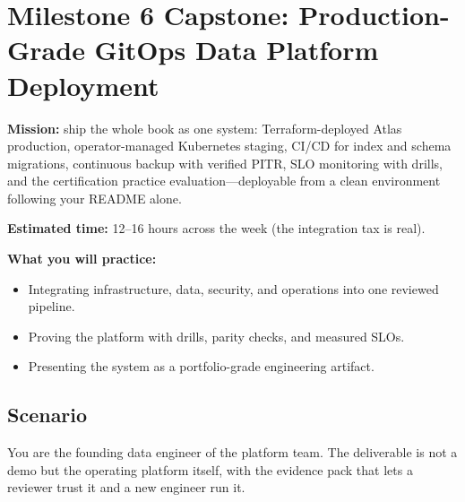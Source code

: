 \section{Milestone 6 Capstone: Production-Grade GitOps Data Platform Deployment}\label{sec:ch24-capstone}

\begin{capstonebox}
\textbf{Mission:} ship the whole book as one system: Terraform-deployed Atlas production, operator-managed Kubernetes staging, CI/CD for index and schema migrations, continuous backup with verified PITR, SLO monitoring with drills, and the certification practice evaluation---deployable from a clean environment following your README alone.

\textbf{Estimated time:} 12--16 hours across the week (the integration tax is real).

\textbf{What you will practice:}
\begin{itemize}
    \item Integrating infrastructure, data, security, and operations into one reviewed pipeline.
    \item Proving the platform with drills, parity checks, and measured SLOs.
    \item Presenting the system as a portfolio-grade engineering artifact.
\end{itemize}
\end{capstonebox}

\subsection*{Scenario}
You are the founding data engineer of the platform team. The deliverable is not a demo but the operating platform itself, with the evidence pack that lets a reviewer trust it and a new engineer run it.

